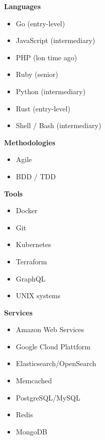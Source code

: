 \documentclass[9pt]{template} %
\begin{document}
\begin{minipage}[t]{0.3\textwidth} %
  \vspace{-\baselineskip}

  \textbf{Languages}
  \begin{itemize}
      \item Go {\footnotesize (entry-level)}
      \item JavaScript {\footnotesize (intermediary)}
      \item PHP {\footnotesize (lon  time ago)}
      \item Ruby {\footnotesize  (senior)}
      \item Python {\footnotesize  (intermediary)}
      \item Rust {\footnotesize (entry-level)}
      \item Shell / Bash {\footnotesize (intermediary)}
  \end{itemize}
\end{minipage}
\hfill
\begin{minipage}[t]{0.3\textwidth}
  \vspace{-\baselineskip}

  \textbf{Methodologies}
  \begin{itemize}
      \item Agile
      \item BDD / TDD
  \end{itemize}

  \textbf{Tools}
  \begin{itemize}
      \item Docker
      \item Git
      \item Kubernetes
      \item Terraform
      \item GraphQL
      \item UNIX systems
  \end{itemize}
\end{minipage}
\hfill
\begin{minipage}[t]{0.3\textwidth}
  \vspace{-\baselineskip}

  \textbf{Services}
  \begin{itemize}
      \item Amazon Web Services
      \item Google Cloud Plattform
      \item Elasticsearch/OpenSearch
      \item Memcached
      \item PostgreSQL/MySQL
      \item Redis
      \item MongoDB
  \end{itemize}
\end{minipage}
\end{document}

